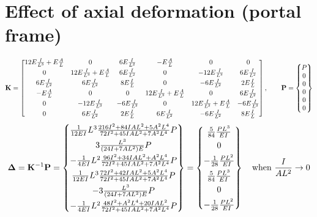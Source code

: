 \section{Effect of axial deformation (portal frame)}
\label{sec:axial-portal}
\begin{fig}
  
\end{fig}
{\small
\begin{equation*}
  \mathbf{K} = \begin{bmatrix}
    12E\frac{I}{L^3} + E\frac AL & 0 & 6E\frac{I}{L^2} & -E\frac AL & 0 & 0\\[3pt]
    0 & 12E\frac{I}{L^3} + E\frac AL & 6E\frac{I}{L^2} & 0 & -12E\frac{I}{L^3} & 6E\frac{I}{L^2}\\[3pt]
    6E\frac{I}{L^2} & 6E\frac{I}{L^2} & 8E\frac IL & 0 & -6E\frac{I}{L^2} & 2E\frac IL\\[3pt]
    -E\frac AL & 0 & 0 & 12E\frac{I}{L^3} + E\frac AL & 0 & 6E\frac{I}{L^2}\\[3pt]
    0 & -12E\frac{I}{L^3} & -6E\frac{I}{L^2} & 0 & 12E\frac{I}{L^3} + E\frac AL & -6E\frac{I}{L^2}\\[3pt]
    0 & 6E\frac{I}{L^2} & 2E\frac IL & 6E\frac{I}{L^2} & -6E\frac{I}{L^2} & 8E\frac IL
  \end{bmatrix},\qquad
  \mathbf{P} = \begin{Bmatrix}P\\ 0\\ 0\\ 0\\ 0\\ 0\end{Bmatrix}
\end{equation*}
\begin{equation*}
  \bm{\Delta} = \mathbf{K}^{-1}\mathbf{P} = \begin{Bmatrix}
    \frac{1}{12EI}L^3\frac{216I^2 + 84IAL^2 + 5A^2L^4}{72I^2 + 45IAL^2 + 7A^2L^4}P\\[4pt]
    3\frac{L^3}{(24I + 7AL^2)E}P\\[4pt]
    -\frac{1}{4EI}L^2\frac{96I^2 + 34IAL^2 + A^2L^4}{72I^2 + 45IAL^2 + 7A^2L^4}P\\[4pt]
    \frac{1}{12EI}L^3\frac{72I^2 + 42IAL^2 + 5A^2L^4}{72I^2 + 45IAL^2 + 7A^2L^4}P\\[4pt]
    -3\frac{L^3}{(24I + 7AL^2)E}P\\[4pt]
    -\frac{1}{4EI}L^2\frac{48I^2 + A^2L^4 + 20IAL^2}{72I^2 + 45IAL^2 + 7A^2L^4}P\end{Bmatrix}
  = \begin{Bmatrix}\frac{5}{84}\frac{PL^3}{EI}\\[4pt] 0\\[4pt] -\frac{1}{28}\frac{PL^2}{EI}\\[4pt] \frac{5}{84}\frac{PL^3}{EI}\\[4pt] 0\\[4pt] -\frac{1}{28}\frac{PL^2}{EI}\end{Bmatrix}
  \quad\text{when }\frac{I}{AL^2}\to 0
\end{equation*}}

